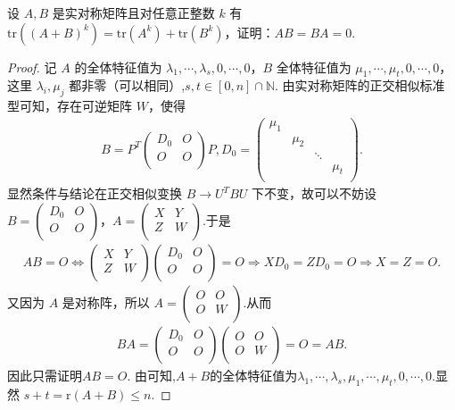 \documentclass[../../main.tex]{subfiles}
\begin{document}
\begin{example}\label{example:例题611}
设 $A,B$ 是实对称矩阵且对任意正整数 $k$ 有 $\mathrm{tr}\left( \left( A+B \right) ^k \right) =\mathrm{tr}\left( A^k \right) +\mathrm{tr}\left( B^k \right) $，证明：$AB=BA=0$.
\end{example}
\begin{proof}
记 $A$ 的全体特征值为 $\lambda_1,\cdots,\lambda_s,0,\cdots,0$，$B$ 全体特征值为 $\mu_1,\cdots,\mu_t,0,\cdots,0$，这里 $\lambda_i,\mu_j$ 都非零（可以相同）,$s,t\in[0,n]\cap \mathbb{N}$.
由实对称矩阵的正交相似标准型可知，存在可逆矩阵 $W$，使得
\begin{align*}
B=P^T\begin{pmatrix}
D_0&		O\\
O&		O\\
\end{pmatrix}P,D_0=\begin{pmatrix}
\mu _1&		&		&		\\
&		\mu _2&		&		\\
&		&		\ddots&		\\
&		&		&		\mu _t\\
\end{pmatrix}.
\end{align*}
显然条件与结论在正交相似变换 $B\rightarrow U^TBU$ 下不变，故可以不妨设 $B=\begin{pmatrix}
D_0&		O\\
O&		O\\
\end{pmatrix}$，$A=\begin{pmatrix}
X&		Y\\
Z&		W\\
\end{pmatrix}$.于是
\begin{align*}
AB=O\Longleftrightarrow \begin{pmatrix}
X&		Y\\
Z&		W\\
\end{pmatrix} \begin{pmatrix}
D_0&		O\\
O&		O\\
\end{pmatrix} =O\Rightarrow XD_0=ZD_0=O\Rightarrow X=Z=O.
\end{align*}
又因为 $A$ 是对称阵，所以 $A=\begin{pmatrix}
O&		O\\
O&		W\\
\end{pmatrix}$.从而
\begin{align*}
BA = \begin{pmatrix}
D_0&		O\\
O&		O\\
\end{pmatrix}\begin{pmatrix}
O&		O\\
O&		W\\
\end{pmatrix} = O = AB.
\end{align*}
因此只需证明$AB=O$.
由可知,$A+B$的全体特征值为$\lambda _1,\cdots ,\lambda _s,\mu _1,\cdots ,\mu _t,0,\cdots ,0.$显然 $s+t=\mathrm{r}\left( A+B \right) \leqslant n$.


\end{proof}
\end{document}
